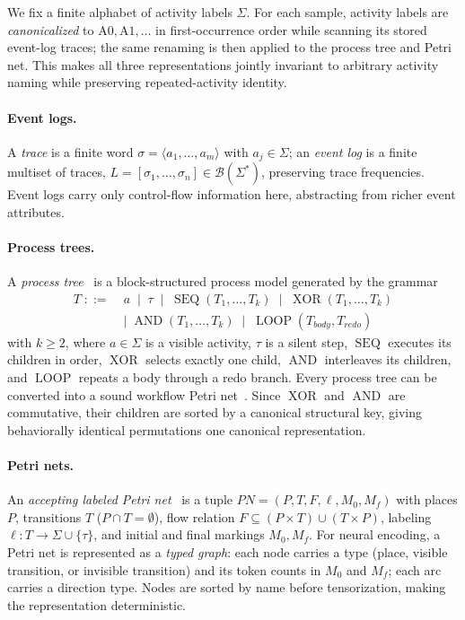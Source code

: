\documentclass[manuscript,screen,nonacm]{acmart}
\begin{document}
We fix a finite alphabet of activity labels $\Sigma$. For each sample, activity labels are \emph{canonicalized} to $\mathrm{A0}, \mathrm{A1}, \ldots$ in first-occurrence order while scanning its stored event-log traces; the same renaming is then applied to the process tree and Petri net. This makes all three representations jointly invariant to arbitrary activity naming while preserving repeated-activity identity.

\paragraph{Event logs.}
A \emph{trace} is a finite word $\sigma = \langle a_1, \ldots, a_m \rangle$ with $a_j \in \Sigma$; an \emph{event log} is a finite multiset of traces, $L = [\sigma_1, \ldots, \sigma_n] \in \mathcal{B}(\Sigma^*)$, preserving trace frequencies. Event logs carry only control-flow information here, abstracting from richer event attributes.

\paragraph{Process trees.}
A \emph{process tree}~\cite{Leemans2013} is a block-structured process model generated by the grammar
\begin{equation}
\begin{split}
T \;::=\;& a \;\mid\; \tau \;\mid\; \operatorname{SEQ}(T_1,\ldots,T_k) \;\mid\; \operatorname{XOR}(T_1,\ldots,T_k)\\
&\mid\; \operatorname{AND}(T_1,\ldots,T_k) \;\mid\; \operatorname{LOOP}(T_{\mathit{body}},T_{\mathit{redo}})
\end{split}
\label{eq:grammar}
\end{equation}
with $k \ge 2$, where $a \in \Sigma$ is a visible activity, $\tau$ is a silent step, $\operatorname{SEQ}$ executes its children in order, $\operatorname{XOR}$ selects exactly one child, $\operatorname{AND}$ interleaves its children, and $\operatorname{LOOP}$ repeats a body through a redo branch. Every process tree can be converted into a sound workflow Petri net~\cite{Leemans2013}. Since $\operatorname{XOR}$ and $\operatorname{AND}$ are commutative, their children are sorted by a canonical structural key, giving behaviorally identical permutations one canonical representation.

\paragraph{Petri nets.}
An \emph{accepting labeled Petri net}~\cite{vanDerAalst2016} is a tuple $\mathit{PN} = (P, T, F, \ell, M_0, M_f)$ with places $P$, transitions $T$ ($P \cap T = \emptyset$), flow relation $F \subseteq (P \times T) \cup (T \times P)$, labeling $\ell : T \to \Sigma \cup \{\tau\}$, and initial and final markings $M_0, M_f$. For neural encoding, a Petri net is represented as a \emph{typed graph}: each node carries a type (place, visible transition, or invisible transition) and its token counts in $M_0$ and $M_f$; each arc carries a direction type. Nodes are sorted by name before tensorization, making the representation deterministic.
\end{document}
